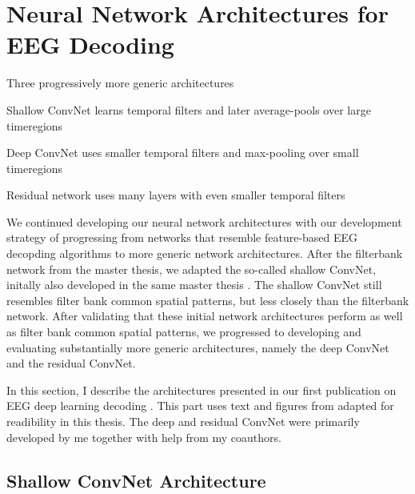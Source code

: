 \chapter{Neural Network Architectures for
EEG Decoding}\label{network-architectures}

\begin{startbox}{Three progressively more generic architectures}
\item Shallow ConvNet learns temporal filters and later average-pools over large timeregions
\item Deep ConvNet uses smaller temporal filters and max-pooling over small timeregions
\item Residual network uses many layers with even smaller temporal filters
\end{startbox}


We continued developing our neural network architectures with our
development strategy of progressing from networks that resemble
feature-based EEG decopding algorithms to more generic network
architectures. After the filterbank network from the master thesis, we
adapted the so-called shallow ConvNet, initally also developed in the
same master thesis \citep{schirrmeister_msc_thesis_2015}.
The shallow ConvNet still resembles filter bank common spatial patterns,
but less closely than the filterbank network. After validating that
these initial network architectures perform as well as filter bank
common spatial patterns, we progressed to developing and evaluating
substantially more generic architectures, namely the deep ConvNet and
the residual ConvNet.

In this section, I describe the architectures presented in our first
publication on EEG deep learning decoding
\citep{schirrmeisterdeephbm2017}. This part uses text and
figures from \citep{schirrmeisterdeephbm2017} adapted for
readibility in this thesis. The deep and residual ConvNet were primarily
developed by me together with help from my coauthors.


    \hypertarget{shallow-convnet-architecture}{%
\section{Shallow ConvNet
Architecture}\label{shallow-convnet-architecture}}

% 

